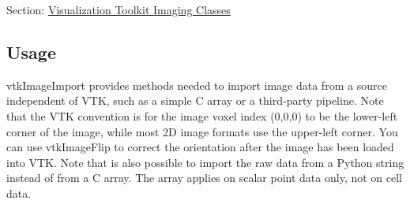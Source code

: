 Section\-: \hyperlink{sec_vtkimaging}{Visualization Toolkit Imaging Classes} \hypertarget{vtkwidgets_vtkxyplotwidget_Usage}{}\subsection{Usage}\label{vtkwidgets_vtkxyplotwidget_Usage}
vtk\-Image\-Import provides methods needed to import image data from a source independent of V\-T\-K, such as a simple C array or a third-\/party pipeline. Note that the V\-T\-K convention is for the image voxel index (0,0,0) to be the lower-\/left corner of the image, while most 2\-D image formats use the upper-\/left corner. You can use vtk\-Image\-Flip to correct the orientation after the image has been loaded into V\-T\-K. Note that is also possible to import the raw data from a Python string instead of from a C array. The array applies on scalar point data only, not on cell data.

